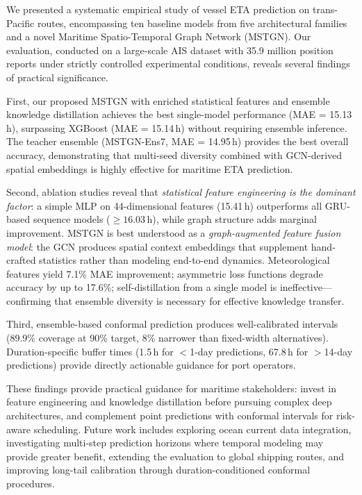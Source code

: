 \documentclass[sigconf,anonymous]{acmart}%
\begin{document}
We presented a systematic empirical study of vessel ETA prediction on trans-Pacific routes, encompassing ten baseline models from five architectural families and a novel Maritime Spatio-Temporal Graph Network (MSTGN).
Our evaluation, conducted on a large-scale AIS dataset with 35.9 million position reports under strictly controlled experimental conditions, reveals several findings of practical significance.

First, our proposed MSTGN with enriched statistical features and ensemble knowledge distillation achieves the best single-model performance (MAE = 15.13\,h), surpassing XGBoost (MAE = 15.14\,h) without requiring ensemble inference.
The teacher ensemble (MSTGN-Ens7, MAE = 14.95\,h) provides the best overall accuracy, demonstrating that multi-seed diversity combined with GCN-derived spatial embeddings is highly effective for maritime ETA prediction.

Second, ablation studies reveal that \textit{statistical feature engineering is the dominant factor}: a simple MLP on 44-dimensional features (15.41\,h) outperforms all GRU-based sequence models (${\geq}16.03$\,h), while graph structure adds marginal improvement. MSTGN is best understood as a \textit{graph-augmented feature fusion model}: the GCN produces spatial context embeddings that supplement hand-crafted statistics rather than modeling end-to-end dynamics. Meteorological features yield 7.1\% MAE improvement; asymmetric loss functions degrade accuracy by up to 17.6\%; self-distillation from a single model is ineffective---confirming that ensemble diversity is necessary for effective knowledge transfer.

Third, ensemble-based conformal prediction produces well-calibrated intervals (89.9\% coverage at 90\% target, 8\% narrower than fixed-width alternatives). Duration-specific buffer times (1.5\,h for $<$1-day predictions, 67.8\,h for $>$14-day predictions) provide directly actionable guidance for port operators.

These findings provide practical guidance for maritime stakeholders: invest in feature engineering and knowledge distillation before pursuing complex deep architectures, and complement point predictions with conformal intervals for risk-aware scheduling.
Future work includes exploring ocean current data integration, investigating multi-step prediction horizons where temporal modeling may provide greater benefit, extending the evaluation to global shipping routes, and improving long-tail calibration through duration-conditioned conformal procedures.
\end{document}

